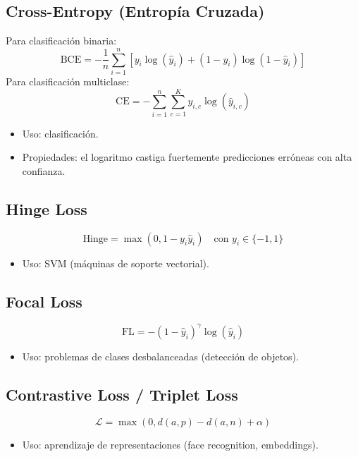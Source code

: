 \documentclass[12pt,a4paper,openany,oneside]{book}
\begin{document}
\subsection{Cross-Entropy (Entropía Cruzada)}
Para clasificación binaria:
\begin{equation*}
\text{BCE} = -\frac{1}{n}\sum_{i=1}^{n} \left[ y_i \log(\hat{y}_i) + (1-y_i)\log(1-\hat{y}_i) \right]
\end{equation*}
Para clasificación multiclase:
\begin{equation*}
\text{CE} = -\sum_{i=1}^{n} \sum_{c=1}^{K} y_{i,c} \log(\hat{y}_{i,c})
\end{equation*}
\begin{itemize}
    \item Uso: clasificación.
    \item Propiedades: el logaritmo castiga fuertemente predicciones erróneas con alta confianza.
\end{itemize}

\subsection{Hinge Loss}
\begin{equation*}
\text{Hinge} = \max(0, 1 - y_i \hat{y}_i) \quad \text{con } y_i \in \{-1,1\}
\end{equation*}
\begin{itemize}
    \item Uso: SVM (máquinas de soporte vectorial).
\end{itemize}

\subsection{Focal Loss}
\begin{equation*}
\text{FL} = -(1 - \hat{y}_i)^\gamma \log(\hat{y}_i)
\end{equation*}
\begin{itemize}
    \item Uso: problemas de clases desbalanceadas (detección de objetos).
\end{itemize}

\subsection{Contrastive Loss / Triplet Loss}
\begin{equation*}
\mathcal{L} = \max(0, d(a,p) - d(a,n) + \alpha)
\end{equation*}
\begin{itemize}
    \item Uso: aprendizaje de representaciones (face recognition, embeddings).
\end{itemize}
\end{document}
